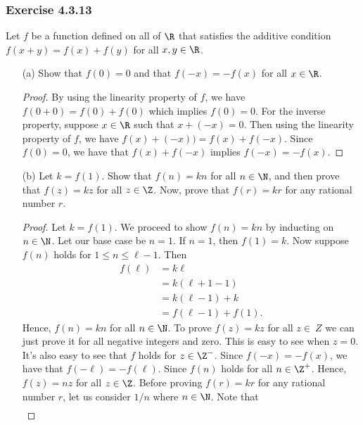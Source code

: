 \subsubsection{Exercise 4.3.13} Let \( f \) be a function defined on all of \( \R  \) that satisfies the additive condition \( f(x+y) = f(x) + f(y) \) for all \( x,y \in \R  \).
\begin{enumerate}
    \item[(a)] Show that \( f(0) = 0  \) and that \( f(-x) = - f(x) \) for all \( x \in \R  \).
        \begin{proof}
        By using the linearity property of \( f \), we have \( f(0 + 0) = f(0) + f(0)  \) which implies \( f(0) = 0 \). For the inverse property, suppose \( x \in \R  \) such that \( x + (-x) = 0  \). Then using the linearity property of \( f \), we have \( f(x) + (-x)) = f(x) + f(-x)   \). Since \( f(0) = 0  \), we have that \( f(x) + f(-x) \) implies \( f(-x) = -f(x)   \).
        \end{proof}
    \item[(b)] Let \( k = f(1) \). Show that \( f(n) = k n \) for all \( n \in \N  \), and then prove that \( f(z) = kz \) for all \( z \in \Z  \). Now, prove that \( f(r) = kr \) for any rational number \( r \).
        \begin{proof}
        Let \( k = f(1) \). We proceed to show \( f(n) = kn \) by inducting on \( n \in \N  \). Let our base case be \( n = 1  \). If \( n = 1  \), then \( f(1) =  k \). Now suppose \( f(n) \) holds for \( 1 \leq n \leq \ell - 1  \). Then 
        \begin{align*}
           f(\ell) &= k \ell \\
                   &= k (\ell + 1 - 1 ) \\
                   &= k(\ell - 1) + k \\
                   &= f(\ell - 1 ) + f(1).
        \end{align*}
        Hence, \( f(n) = kn \) for all \( n \in \N  \). To prove \( f(z) = kz \) for all \( z \in \ Z \) we can just prove it for all negative integers and zero. This is easy to see when \( z = 0  \). It's also easy to see that \( f \) holds for \( z \in \Z^{-} \). Since \( f(-x) = -f(x) \), we have that \( f(-\ell) = - f(\ell) \). Since \( f(n)  \) holds for all \( n \in \Z^{+} \). Hence, \( f(z) = nz \) for all \( z \in \Z \). 
    Before proving \( f(r) = kr  \) for any rational number \( r  \), let us consider \( 1/n  \) where \( n \in \N  \). Note that 
    \begin{align*}

\end{align*}
\end{proof}
\end{enumerate}
